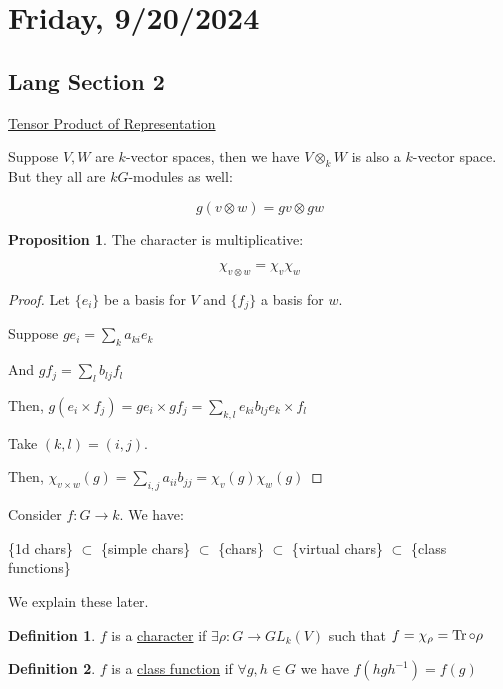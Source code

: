 \documentclass{article}
\theoremstyle{definition}
\newtheorem*{definition}{Definition}
\newtheorem{proposition}[theorem]{Proposition}
\begin{document}
\section*{Friday, 9/20/2024}

\subsection*{Lang Section 2}

\underline{Tensor Product of Representation} 

Suppose \(V,W\) are \(k\)-vector spaces, then we have \(V \otimes _ k W\) is also a \(k\)-vector space. But they all are \(kG\)-modules as well:

\[
    g(v \otimes w) = gv \otimes gw
\]

\begin{proposition}
    The character is multiplicative:

    \[
        \chi _{v \otimes w} = \chi _v \chi _w
    \]
\end{proposition}

\begin{proof}
    Let \(\{ e_i \} \) be a basis for \(V\) and \(\{ f_j \} \) a basis for \(w\).

    Suppose \(g e_i = \sum_{k} a_{ki} e_k\) 

    And \(g f_j = \sum_{l} b_{lj} f_l\)
    
    Then, \(g(e_i \times f_j) = ge_i \times gf_j = \sum_{k,l} e_{ki}b_{lj} e_k \times f_l\)
    
    Take \((k,l) = (i,j)\).

    Then, \(\chi_{v \times w} (g) = \sum_{i,j} a_{i i} b_{j j} = \chi_v(g) \chi_w(g) \) 
\end{proof}

Consider \(f : G \to k\). We have:

\{1d chars\} \(\subset\) \{simple chars\} \(\subset\) \{chars\} \(\subset\) \{virtual chars\} \(\subset\) \{class functions\}

We explain these later.

\begin{definition}
    \(f\) is a \underline{character} if \(\exists \rho : G \to GL_k(V)\) such that \(f = \chi_{\rho} = \Tr \circ \rho\) 
\end{definition}

\begin{definition}
    \(f\) is a \underline{class function} if \(\forall g, h \in G\) we have \(f(h g h ^{-1}) = f(g)\)
\end{definition}
\end{document}
